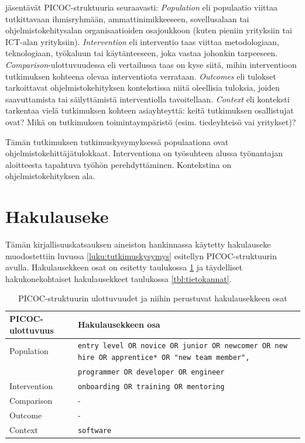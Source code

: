 \documentclass[utf8]{gradu3}
\begin{document}
\textcite{kitchenham-charters-2007} jäsentävät PICOC-struktuuria seuraavasti: \textit{Population} eli populaatio viittaa tutkittavaan ihmisryhmään, ammattinimikkeeseen, sovellusalaan tai ohjelmistokehitysalan organisaatioiden osajoukkoon (kuten pieniin yrityksiin tai ICT-alan yrityksiin). \textit{Intervention} eli interventio taas viittaa metodologiaan, teknologiaan, työkaluun tai käytänteeseen, joka vastaa johonkin tarpeeseen. \textit{Comparison}-ulottuvuudessa eli vertailussa taas on kyse siitä, mihin interventioon tutkimuksen kohteena olevaa interventiota verrataan. \textit{Outcomes} eli tulokset tarkoittavat ohjelmistokehityksen kontekstissa niitä oleellisia tuloksia, joiden saavuttamista tai säilyttämistä interventiolla tavoitellaan. \textit{Context} eli konteksti tarkentaa vielä tutkimuksen kohteen asiayhteyttä: keitä tutkimuksen osallistujat ovat? Mikä on tutkimuksen toimintaympäristö (esim. tiedeyhteisö vai yritykset)? \parencite{kitchenham-charters-2007}

Tämän tutkimuksen tutkimuskysymyksessä populaationa ovat ohjelmistokehittäjätulokkaat. Interventiona on työsuhteen alussa työnantajan aloitteesta tapahtuva työhön perehdyttäminen. Kontekstina on ohjelmistokehityksen ala. 

\section{Hakulauseke}

Tämän kirjallisuuskatsauksen aineiston hankinnassa käytetty hakulauseke muodostettiin luvussa  \ref{luku:tutkimuskysymys} esitellyn PICOC-struktuurin avulla. Hakulausekkeen osat on esitetty taulukossa \ref{tbl:picoc-ulottuvuudet} ja täydelliset hakukonekohtaiset hakulausekkeet taulukossa \ref{tbl:tietokannat}.

\begin{table}[h]
    \footnotesize
    \begin{tabular}{lp{}}
        \toprule
        {PICOC-ulottuvuus} & Hakulausekkeen osa \\
        \midrule
        Population & {\tt entry level OR novice OR junior OR newcomer OR new hire OR apprentice* OR "new team member", } \\
        & {\tt programmer OR developer OR engineer} \\
        \midrule
        Intervention & {\tt onboarding OR training OR mentoring} \\
        \midrule
        Comparison & - \\
        \midrule
        Outcome & - \\
        \midrule
        Context & {\tt software} \\
        \bottomrule
    \end{tabular}  
    \caption{PICOC-struktuurin ulottuvuudet ja niihin perustuvat hakulausekkeen osat}
    \label{tbl:picoc-ulottuvuudet}
\end{table}
\end{document}
